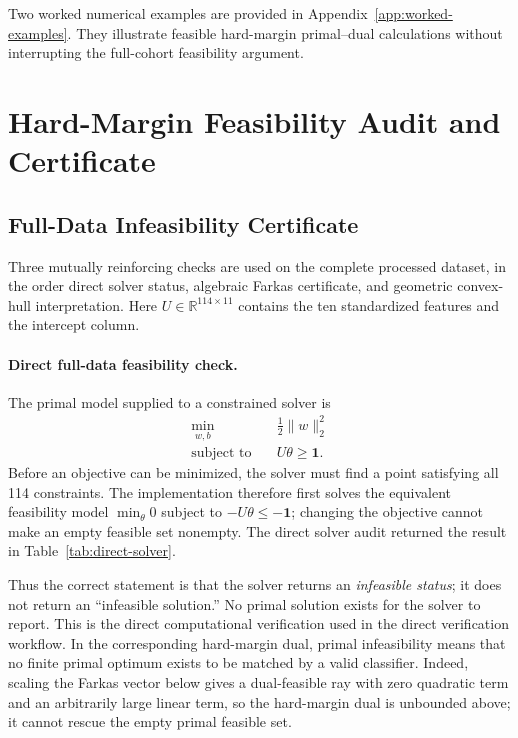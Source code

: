 \documentclass[11pt,a4paper]{article}
\numberwithin{equation}{section} %
\begin{document}
Two worked numerical examples are provided in Appendix~\ref{app:worked-examples}. They illustrate feasible hard-margin primal--dual calculations without interrupting the full-cohort feasibility argument.

\section{Hard-Margin Feasibility Audit and Certificate}

\subsection{Full-Data Infeasibility Certificate}
\label{sec:full-certificate}

Three mutually reinforcing checks are used on the complete processed dataset,
in the order direct solver status, algebraic Farkas certificate, and geometric
convex-hull interpretation. Here
$U\in\mathbb{R}^{114\times11}$ contains the ten standardized features and the
intercept column.

\paragraph{Direct full-data feasibility check.}
The primal model supplied to a constrained solver is
\begin{equation}
\begin{aligned}
\min_{w,b}\quad &\frac12\lVert w\rVert_2^2\\
\text{subject to}\quad &U\theta\geq\mathbf{1}.
\end{aligned}
\end{equation}
Before an objective can be minimized, the solver must find a point satisfying
all 114 constraints. The implementation therefore first solves the equivalent
feasibility model $\min_\theta 0$ subject to $-U\theta\leq-\mathbf{1}$; changing
the objective cannot make an empty feasible set nonempty. The direct solver
audit returned the result in Table~\ref{tab:direct-solver}.

\begin{table}[htbp]
\centering
\caption{Direct full-data primal feasibility check.}
\label{tab:direct-solver}

\end{table}

Thus the correct statement is that the solver returns an \emph{infeasible
status}; it does not return an ``infeasible solution.'' No primal solution
exists for the solver to report. This is the direct computational verification
used in the direct verification workflow. In the corresponding hard-margin
dual, primal infeasibility means that no finite primal optimum exists to be
matched by a valid classifier. Indeed, scaling the Farkas vector below gives a
dual-feasible ray with zero quadratic term and an arbitrarily large linear
term, so the hard-margin dual is unbounded above; it cannot rescue the empty
primal feasible set.
\end{document}
